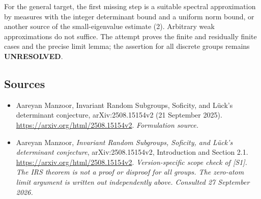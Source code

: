 \documentclass[11pt]{article}
\begin{document}
For the general target, the first missing step is a suitable spectral
approximation by measures with the integer determinant bound and a
uniform norm bound, or another source of the small-eigenvalue estimate
(2). Arbitrary weak approximations do not suffice. The attempt proves
the finite and residually finite cases and the precise limit lemma;
the assertion for all discrete groups remains \textbf{UNRESOLVED}.

\subsection{Sources}
\begin{itemize}
\item[S1]Aareyan Manzoor, Invariant Random Subgroups, Soficity, and Lück's determinant conjecture, arXiv:2508.15154v2 (21 September 2025).
\url{https://arxiv.org/html/2508.15154v2}.
\textit{Formulation source.}
\item[E1]Aareyan Manzoor, \emph{Invariant Random Subgroups, Soficity,
and L\"uck's determinant conjecture}, arXiv:2508.15154v2,
Introduction and Section 2.1.
\url{https://arxiv.org/html/2508.15154v2}.
\textit{Version-specific scope check of [S1]. The IRS theorem is not
a proof or disproof for all groups. The zero-atom limit argument is
written out independently above. Consulted 27 September 2026.}

\end{itemize}
\end{document}
